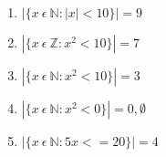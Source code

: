 \documentclass[../main.tex]{subfiles}
\begin{document}
\begin{enumerate}
\begin{enumerate}[resume]
      \item $|\{x~\epsilon~\mathbb{N} : |x| < 10\}| = 9$
      \item $|\{x~\epsilon~\mathbb{Z} : x^2 < 10\}| = 7$
      \item $|\{x~\epsilon~\mathbb{N} : x^2 < 10\}| = 3$
      \item $|\{x~\epsilon~\mathbb{N} : x^2 < 0\}| = 0, \emptyset$
      \item $|\{x~\epsilon~\mathbb{N} : 5x <= 20\}| = 4$

    \end{enumerate}

\end{enumerate}
\end{document}
